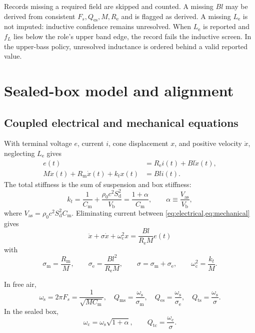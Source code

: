 \documentclass[11pt,a4paper]{article}
\numberwithin{equation}{section}
\newcommand{\Sd}{S_{\mathrm{d}}}
\newcommand{\Mms}{M}
\renewcommand{\Re}{R_{\mathrm{e}}}
\newcommand{\Le}{L_{\mathrm{e}}}
\newcommand{\Rms}{R_{\mathrm{m}}}
\newcommand{\Cms}{C_{\mathrm{m}}}
\newcommand{\Bl}{Bl}
\newcommand{\Qes}{Q_{\mathrm{es}}}
\newcommand{\Qms}{Q_{\mathrm{ms}}}
\newcommand{\Qts}{Q_{\mathrm{ts}}}
\newcommand{\Qtc}{Q_{\mathrm{tc}}}
\newcommand{\Vas}{V_{\mathrm{as}}}
\newcommand{\Vb}{V_{\mathrm{b}}}
\newcommand{\ws}{\omega_{\mathrm{s}}}
\newcommand{\wc}{\omega_{\mathrm{c}}}
\newcommand{\se}{\sigma_{\mathrm{e}}}
\newcommand{\sm}{\sigma_{\mathrm{m}}}
\begin{document}
Records missing a required field are skipped and counted.  A missing $\Bl$
may be derived from consistent $F_s,\Qes,\Mms,\Re$ and is flagged as derived.
A missing $\Le$ is not imputed: inductive confidence remains unresolved.
When $\Le$ is reported and $f_L$ lies below the role's upper band edge, the
record fails the inductive screen.  In the upper-bass policy, unresolved
inductance is ordered behind a valid reported value.

\section{Sealed-box model and alignment}
\label{sec:model}

\subsection{Coupled electrical and mechanical equations}

With terminal voltage $e$, current $i$, cone displacement $x$, and positive
velocity $\dot x$, neglecting $\Le$ gives
\begin{align}
	e(t)&=\Re i(t)+\Bl\dot x(t), \label{eq:electrical}\\
	\Mms\ddot x(t)+\Rms\dot x(t)+k_t x(t)&=\Bl i(t).
	\label{eq:mechanical}
\end{align}
The total stiffness is the sum of suspension and box stiffness:
\begin{equation}
	k_t=\frac{1}{\Cms}+\frac{\rho_0c^2\Sd^2}{\Vb}
	=\frac{1+\alpha}{\Cms},
	\qquad
	\alpha\equiv\frac{\Vas}{\Vb},
	\label{eq:stiffness}
\end{equation}
where $\Vas=\rho_0c^2\Sd^2\Cms$.  Eliminating current between
\cref{eq:electrical,eq:mechanical} gives
\begin{equation}
	\boxed{
	\ddot{x}+\sigma\dot{x}+\wc^2x
	=\frac{\Bl}{\Re\Mms}e(t)}
	\label{eq:ode}
\end{equation}
with
\begin{equation}
	\sm=\frac{\Rms}{\Mms},\qquad
	\se=\frac{\Bl^2}{\Re\Mms},\qquad
	\sigma=\sm+\se,\qquad
	\wc^2=\frac{k_t}{\Mms}.
	\label{eq:damping}
\end{equation}

In free air,
\begin{equation}
	\ws=2\pi F_s=\frac{1}{\sqrt{\Mms\Cms}},\quad
	\Qms=\frac{\ws}{\sm},\quad
	\Qes=\frac{\ws}{\se},\quad
	\Qts=\frac{\ws}{\sigma}.
	\label{eq:freeair}
\end{equation}
In the sealed box,
\begin{equation}
	\wc=\ws\sqrt{1+\alpha},\qquad
	\Qtc=\frac{\wc}{\sigma}.
	\label{eq:boxed}
\end{equation}
\end{document}
